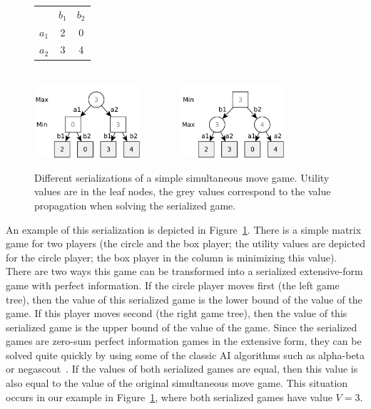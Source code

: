 \begin{figure}
\centering
\begin{tabular}{l|c|c|}
 \multicolumn{1}{c}{~} & \multicolumn{1}{c}{$b_1$}  &  \multicolumn{1}{c}{$b_2$}\\\cline{2-3}
$a_1$ &  2  &  0\\\cline{2-3}
$a_2$ &  3  &  4\\\cline{2-3}
\end{tabular}
\\\vspace{0.5cm}
\includegraphics[width=0.35\textwidth]{figures/serialization1.pdf}~~~~~~~
\includegraphics[width=0.35\textwidth]{figures/serialization2.pdf}
\caption{Different serializations of a simple simultaneous move game. Utility values are in the leaf nodes, the grey values correspond to the value propagation when solving the serialized game.}\label{fig:serialization}
\end{figure}

An example of this serialization is depicted in Figure~\ref{fig:serialization}.
There is a simple matrix game for two players (the circle and the box player; the utility values are depicted for the circle player; the box player in the column is minimizing this value).
There are two ways this game can be transformed into a serialized extensive-form game with perfect information.
If the circle player moves first (the left game tree), then the value of this serialized game is the lower bound of the value of the game. If this player moves second (the right game tree), then the value of this serialized game is the upper bound of the value of the game.
Since the serialized games are zero-sum perfect information games in the extensive form, they can be solved quite quickly by using some of the classic AI
algorithms such as alpha-beta or negascout~\cite{Negascout}.
If the values of both serialized games are equal, then this value is also equal to the value of the original simultaneous move game.
This situation occurs in our example in Figure~\ref{fig:serialization}, where both serialized games have value $V = 3$.

